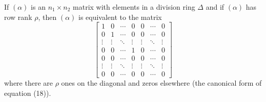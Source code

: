 If $(\alpha)$ is an $n_1 \times n_2$ matrix with elements in a division ring $\Delta$ and if $(\alpha)$ has row rank $\rho$, then $(\alpha)$ is equivalent to the matrix
$$
\begin{bmatrix}
1 & 0 & \cdots & 0 & 0 & \cdots & 0 \\
0 & 1 & \cdots & 0 & 0 & \cdots & 0 \\
\vdots & \vdots & \ddots & \vdots & \vdots & \ddots & \vdots \\
0 & 0 & \cdots & 1 & 0 & \cdots & 0 \\
0 & 0 & \cdots & 0 & 0 & \cdots & 0 \\
\vdots & \vdots & \ddots & \vdots & \vdots & \ddots & \vdots \\
0 & 0 & \cdots & 0 & 0 & \cdots & 0
\end{bmatrix}
$$
where there are $\rho$ ones on the diagonal and zeros elsewhere (the canonical form of equation (18)).
